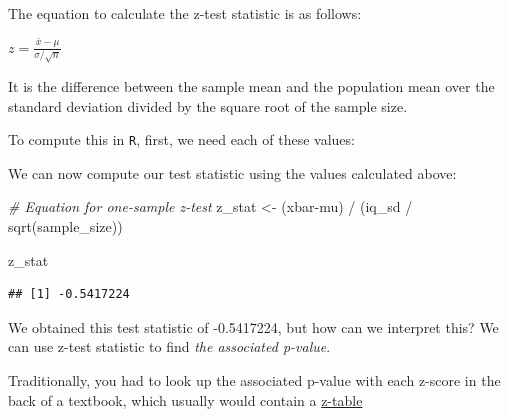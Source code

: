 \documentclass[
]{book}
\newenvironment{Shaded}{\begin{snugshade}}{\end{snugshade}}
\newcommand{\CommentTok}[1]{\textcolor[rgb]{0.56,0.35,0.01}{\textit{#1}}}
\newcommand{\DecValTok}[1]{\textcolor[rgb]{0.00,0.00,0.81}{#1}}
\newcommand{\FunctionTok}[1]{\textcolor[rgb]{0.00,0.00,0.00}{#1}}
\newcommand{\NormalTok}[1]{#1}
\newcommand{\OtherTok}[1]{\textcolor[rgb]{0.56,0.35,0.01}{#1}}
\newcommand{\SpecialCharTok}[1]{\textcolor[rgb]{0.00,0.00,0.00}{#1}}
\begin{document}
The equation to calculate the z-test statistic is as follows:

\(z = \frac{\bar{x}-\mu}{\sigma/\sqrt{n}}\)

It is the difference between the sample mean and the population mean over the standard deviation divided by the square root of the sample size.

To compute this in \texttt{R}, first, we need each of these values:

\begin{Shaded}
\end{Shaded}

We can now compute our test statistic using the values calculated above:

\begin{Shaded}
\begin{Highlighting}[]
\CommentTok{\# Equation for one{-}sample z{-}test}
\NormalTok{z\_stat }\OtherTok{\textless{}{-}}\NormalTok{ (xbar}\SpecialCharTok{{-}}\NormalTok{mu) }\SpecialCharTok{/}\NormalTok{ (iq\_sd }\SpecialCharTok{/} \FunctionTok{sqrt}\NormalTok{(sample\_size)) }

\NormalTok{z\_stat}
\end{Highlighting}
\end{Shaded}

\begin{verbatim}
## [1] -0.5417224
\end{verbatim}

We obtained this test statistic of -0.5417224, but how can we interpret this? We can use z-test statistic to find \emph{the associated p-value}.

Traditionally, you had to look up the associated p-value with each z-score in the back of a textbook, which usually would contain a \href{https://www.math.arizona.edu/~rsims/ma464/standardnormaltable.pdf}{z-table}
\end{document}
